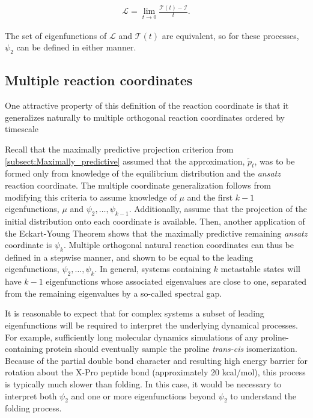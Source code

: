 \documentclass[aip, jcp, preprint, linenumbers, nofootinbib]{revtex4-1}
\begin{document}
\begin{align}
\mathcal{L} = \lim_{t\rightarrow 0} \frac{\mathcal{T}(t) - \mathcal{I}}{t}.
\end{align}

The set of eigenfunctions of $\mathcal{L}$ and $\mathcal{T}(t)$ are equivalent, so for these processes, $\psi_2$ can be defined in either manner.

\subsection{Multiple reaction coordinates}
\label{subsect:multiple_reaction_coordinates}
One attractive property of this definition of the reaction coordinate is that it generalizes naturally to multiple orthogonal reaction coordinates ordered by timescale

Recall that the maximally predictive projection criterion from \cref{subsect:Maximally_predictive} assumed that the approximation, $\tilde{p}_t$, was to be formed only from knowledge of the equilibrium distribution and the \emph{ansatz} reaction coordinate. The multiple coordinate generalization follows from modifying this criteria to assume knowledge of $\mu$ and the first $k-1$ eigenfunctions, $\mu$ and $\psi_2, \ldots, \psi_{k-1}$. Additionally, assume that the projection of the initial distribution onto each coordinate is available. Then, another application of the Eckart-Young Theorem shows that the maximally predictive remaining \emph{ansatz} coordinate is $\psi_{k}$. Multiple orthogonal natural reaction coordinates can thus be defined in a stepwise manner, and shown to be equal to the leading eigenfunctions, $\psi_2, \ldots, \psi_k$. In general, systems containing $k$ metastable states will have $k-1$ eigenfunctions whose associated eigenvalues are close to one, separated from the remaining eigenvalues by a so-called spectral gap.\cite{prinz2011markov}

It is reasonable to expect that for complex systems a subset of leading eigenfunctions will be required to interpret the underlying dynamical processes. For example, sufficiently long molecular dynamics simulations of any proline-containing protein should eventually sample the proline \textit{trans-cis} isomerization. Because of the partial double bond character and resulting high energy barrier for rotation about the X-Pro peptide bond (approximately 20 kcal/mol), this process is typically much slower than folding.\cite{Wedemeyer_Biochemistry02, Banushkina_JCP15} In this case, it would be necessary to interpret both $\psi_2$ and one or more eigenfunctions beyond $\psi_2$ to understand the folding process.
\end{document}
